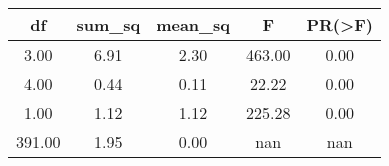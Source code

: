 \begin{tabular}{|c|c|c|c|c|}
\toprule
    df &  sum\_sq &  mean\_sq &      F &  PR(>F) \\
\midrule
  3.00 &    6.91 &     2.30 & 463.00 &    0.00 \\
  4.00 &    0.44 &     0.11 &  22.22 &    0.00 \\
  1.00 &    1.12 &     1.12 & 225.28 &    0.00 \\
391.00 &    1.95 &     0.00 &    nan &     nan \\
\bottomrule
\end{tabular}
